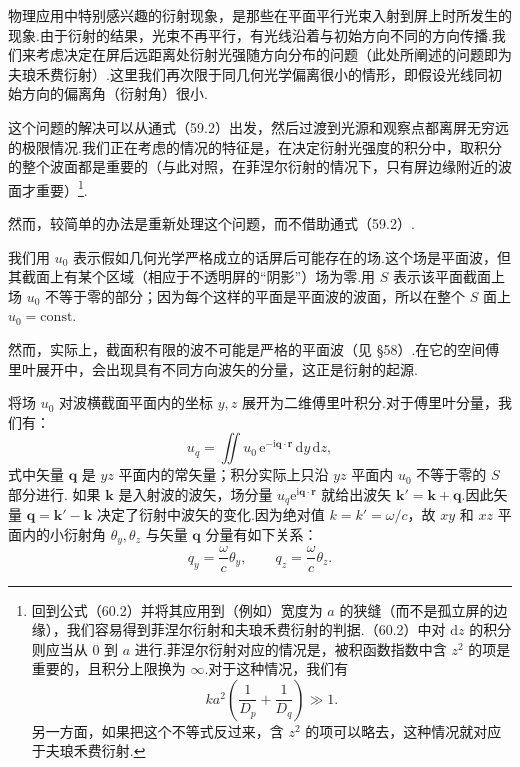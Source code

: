 物理应用中特别感兴趣的衍射现象，是那些在平面平行光束入射到屏上时所发生的现象.由于衍射的结果，光束不再平行，有光线沿着与初始方向不同的方向传播.我们来考虑决定在屏后远距离处衍射光强随方向分布的问题（此处所阐述的问题即为夫琅禾费衍射）.这里我们再次限于同几何光学偏离很小的情形，即假设光线同初始方向的偏离角（衍射角）很小.

这个问题的解决可以从通式（59.2）出发，然后过渡到光源和观察点都离屏无穷远的极限情况.我们正在考虑的情况的特征是，在决定衍射光强度的积分中，取积分的整个波面都是重要的（与此对照，在菲涅尔衍射的情况下，只有屏边缘附近的波面才重要）\footnote{回到公式（60.2）并将其应用到（例如）宽度为 $a$ 的狭缝（而不是孤立屏的边缘），我们容易得到菲涅尔衍射和夫琅禾费衍射的判据.（60.2）中对 $\mathrm{d}z$ 的积分则应当从 0 到 $a$ 进行.菲涅尔衍射对应的情况是，被积函数指数中含 $z^2$ 的项是重要的，且积分上限换为 $\infty$.对于这种情况，我们有
\begin{equation*}
  ka^2\left(\frac{1}{D_p}+\frac{1}{D_q}\right)\gg 1.
\end{equation*}
另一方面，如果把这个不等式反过来，含 $z^2$ 的项可以略去，这种情况就对应于夫琅禾费衍射.}.

然而，较简单的办法是重新处理这个问题，而不借助通式（59.2）.

我们用 $u_0$ 表示假如几何光学严格成立的话屏后可能存在的场.这个场是平面波，但其截面上有某个区域（相应于不透明屏的“阴影”）场为零.用 $S$ 表示该平面截面上场 $u_0$ 不等于零的部分；因为每个这样的平面是平面波的波面，所以在整个 $S$ 面上 $u_0=\mathrm{const}$.

然而，实际上，截面积有限的波不可能是严格的平面波（见 §58）.在它的空间傅里叶展开中，会出现具有不同方向波矢的分量，这正是衍射的起源.

将场 $u_0$ 对波横截面平面内的坐标 $y,z$ 展开为二维傅里叶积分.对于傅里叶分量，我们有：
\begin{equation}
  u_q=\iint u_0\,\mathrm{e}^{-\mathrm{i}\boldsymbol{q}\cdot\boldsymbol{r}}\,
  \mathrm{d}y\,\mathrm{d}z,
\end{equation}
式中矢量 $\boldsymbol{q}$ 是 $yz$ 平面内的常矢量；积分实际上只沿 $yz$ 平面内 $u_0$ 不等于零的 $S$ 部分进行. 如果 $\boldsymbol{k}$ 是入射波的波矢，场分量 $u_q\mathrm{e}^{\mathrm{i}\boldsymbol{q}\cdot\boldsymbol{r}}$ 就给出波矢 $\boldsymbol{k}'=\boldsymbol{k}+\boldsymbol{q}$.因此矢量 $\boldsymbol{q}=\boldsymbol{k}'-\boldsymbol{k}$ 决定了衍射中波矢的变化.因为绝对值 $k=k'=\omega/c$，故 $xy$ 和 $xz$ 平面内的小衍射角 $\theta_y,\theta_z$ 与矢量 $\boldsymbol{q}$ 分量有如下关系：
\begin{equation}
  q_y=\frac{\omega}{c}\theta_y,\qquad
  q_z=\frac{\omega}{c}\theta_z.
\end{equation}

